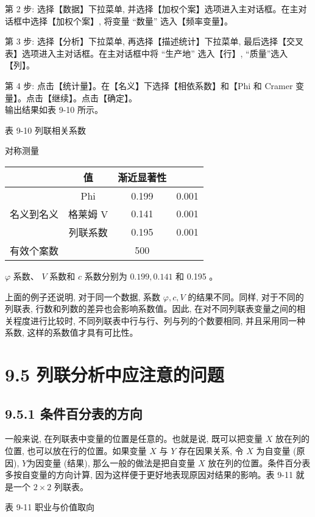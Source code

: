 \documentclass[10pt]{article}
\begin{document}
\begin{CJK*}{UTF8}{bsmi}
第 2 步: 选择【数据】下拉菜单, 并选择【加权个案】选项进入主对话框。在主对话框中选择【加权个案】, 将变量 “数量” 选入【频率变量】。

第 3 步: 选择【分析】下拉菜单, 再选择【描述统计】下拉菜单, 最后选择【交叉表】选项进入主对话框。在主对话框中将 “生产地” 选入【行】, “质量”选入【列】。

第 4 步: 点击【统计量】。在【名义】下选择【相依系数】和【Phi 和 Cramer 变量】。点击【继续】。点击【确定】。\\
输出结果如表 9-10 所示。

表 9-10 列联相关系数

对称测量

\begin{center}
\begin{tabular}{cccc}
\hline
 & 值 & 渐近显著性 &  \\
\hline
 & Phi & 0.199 & 0.001 \\
名义到名义 & 格莱姆 $\mathrm{V}$ & 0.141 & 0.001 \\
 & 列联系数 & 0.195 & 0.001 \\
有效个案数 &  & 500 &  \\
\hline
\end{tabular}
\end{center}

$\varphi$ 系数、 $V$ 系数和 $c$ 系数分别为 $0.199,0.141$ 和 0.195 。

上面的例子还说明, 对于同一个数据, 系数 $\varphi, c, V$ 的结果不同。同样, 对于不同的列联表, 行数和列数的差异也会影响系数值。因此, 在对不同列联表变量之间的相关程度进行比较时, 不同列联表中行与行、列与列的个数要相同, 并且采用同一种系数, 这样的系数值才具有可比性。

\section*{9.5 列联分析中应注意的问题}
\subsection*{9.5.1 条件百分表的方向}
一般来说, 在列联表中变量的位置是任意的。也就是说, 既可以把变量 $X$ 放在列的位置, 也可以放在行的位置。如果变量 $X$ 与 $Y$ 存在因果关系, 令 $X$ 为自变量 (原因), $Y$为因变量 (结果), 那么一般的做法是把自变量 $X$ 放在列的位置。条件百分表多按自变量的方向计算, 因为这样便于更好地表现原因对结果的影响。表 9-11 就是一个 $2 \times 2$ 列联表。

表 9-11 职业与价值取向


\end{CJK*}
\end{document}
